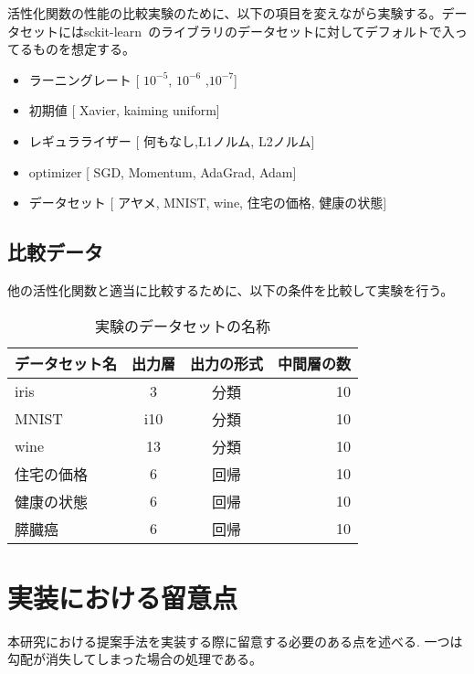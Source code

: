活性化関数の性能の比較実験のために、以下の項目を変えながら実験する。データセットにはsckit-learn~\cite{scikit-learn}のライブラリのデータセットに対してデフォルトで入ってるものを想定する。
\begin{itemize}

    \setlength{\parskip}{0cm} %
    \setlength{\itemsep}{0cm} %
    \item ラーニングレート [ $10^{-5}$, $10^{-6}$ ,$10^{-7}$]
    \item 初期値 [ Xavier, kaiming uniform]
    \item レギュラライザー [ 何もなし,L1ノルム, L2ノルム]
    \item optimizer [ SGD, Momentum, AdaGrad, Adam]
    \item データセット [ アヤメ, MNIST, wine, 住宅の価格, 健康の状態]
\end{itemize}



\subsection{比較データ}

他の活性化関数と適当に比較するために、以下の条件を比較して実験を行う。


\begin{table}[htbp]
    \begin{center}
        \caption{実験のデータセットの名称}
        \vspace{5mm} 
        \begin{tabular}{l*{2}{c}r}
        データセット名      & 出力層 & 出力の形式 & 中間層の数 \\
        \hline
        iris            & 3  & 分類 & 10  \\
        MNIST               & i10 & 分類 & 10   \\
        wine        & 13 & 分類 & 10  \\
        住宅の価格           & 6 & 回帰 & 10  \\
        健康の状態           & 6 & 回帰 & 10  \\
        膵臓癌           & 6 & 回帰 & 10  \\
        \end{tabular}
    \end{center}
\end{table}




\section{実装における留意点}
本研究における提案手法を実装する際に留意する必要のある点を述べる.
一つは勾配が消失してしまった場合の処理である。



